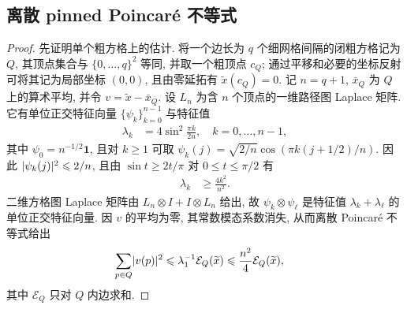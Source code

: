\documentclass{ctexart}
\newcommand{\q}{\quad}
\newcommand{\ti}[1]{\widetilde{#1}}
\renewcommand{\ge}{\geqslant}
\renewcommand{\le}{\leqslant}
\DeclarePairedDelimiter\abs{\lvert}{\rvert}
\begin{document}
\subsection{离散 pinned Poincar\'e 不等式}
\begin{proof}
先证明单个粗方格上的估计. 将一个边长为 $q$ 个细网格间隔的闭粗方格记为 $Q$, 其顶点集合与 $\{0,\ldots,q\}^2$ 等同, 并取一个粗顶点 $c_Q$; 通过平移和必要的坐标反射可将其记为局部坐标 $(0,0)$, 且由零延拓有 $\ti x(c_Q)=0$. 记 $n=q+1$, $\bar x_Q$ 为 $Q$ 上的算术平均, 并令 $v=\ti x-\bar x_Q$. 设 $L_n$ 为含 $n$ 个顶点的一维路径图 Laplace 矩阵. 它有单位正交特征向量 $\{\psi_k\}_{k=0}^{n-1}$ 与特征值
\begin{align}
    \lambda_k&=4\sin^2\frac{\pi k}{2n},\q k=0,\ldots,n-1,
    \label{eq:path-neumann-eigenvalues}
\end{align}
其中 $\psi_0=n^{-1/2}\bm 1$, 且对 $k\ge1$ 可取
$\psi_k(j)=\sqrt{2/n}\cos(\pi k(j+1/2)/n)$. 因此
$\abs{\psi_k(j)}^2\le2/n$, 且由 $\sin t\ge2t/\pi$ 对 $0\le t\le\pi/2$ 有
\begin{align}
    \lambda_k&\ge\frac{4k^2}{n^2}.
    \label{eq:path-neumann-eigenvalue-lower}
\end{align}
二维方格图 Laplace 矩阵由 $L_n\otimes I+I\otimes L_n$ 给出, 故
$\psi_k\otimes\psi_\ell$ 是特征值 $\lambda_k+\lambda_\ell$ 的单位正交特征向量. 因 $v$ 的平均为零, 其常数模态系数消失, 从而离散 Poincar\'e 不等式给出
\begin{align}
    \sum_{p\in Q}\abs{v(p)}^2
    &\le\lambda_1^{-1}\mathcal E_Q(\ti x)
     \le\frac{n^2}{4}\mathcal E_Q(\ti x),
    \label{eq:cell-mean-poincare}
\end{align}
其中 $\mathcal E_Q$ 只对 $Q$ 内边求和.


\end{proof}
\end{document}
